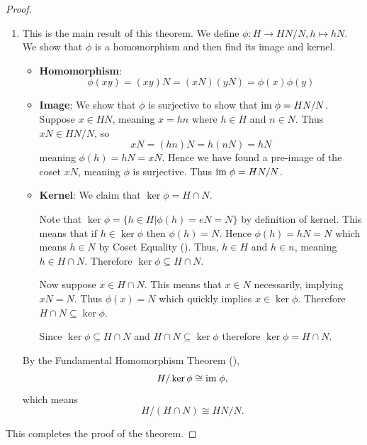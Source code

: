 \begin{proof}
\begin{enumerate}
        \item This is the main result of this theorem. We define $\phi: H \to HN/N, h \mapsto hN$. We show that $\phi$ is a homomorphism and then find its image and kernel.
        \begin{itemize}
            \item \textbf{Homomorphism}:
            \[
                \phi(xy) = (xy)N = (xN)(yN) = \phi(x)\phi(y)    
            \]

            \item \textbf{Image}: We show that $\phi$ is surjective to show that $\mathrm{im}\;\phi = HN/N$. Suppose $x \in HN$, meaning $x = hn$ where $h \in H$ and $n \in N$. Thus $xN \in HN/N$, so
            \[
                xN = (hn)N = h(nN) = hN
            \]
            meaning $\phi(h) = hN = xN$. Hence we have found a pre-image of the coset $xN$, meaning $\phi$ is surjective. Thus $\mathrm{im}\; \phi = HN/N$.

            \item \textbf{Kernel}: We claim that $\ker\phi = H \cap N$.
            
            Note that $\ker\phi = \{h \in H \vert \phi(h) = eN = N\}$ by definition of kernel. This means that if $h \in \ker\phi$ then $\phi(h) = N$. Hence $\phi(h) = hN = N$ which means $h \in N$ by Coset Equality (). Thus, $h \in H$ and $h \in n$, meaning $h \in H \cap N$. Therefore $\ker \phi \subseteq H \cap N$.
    
            Now suppose $x \in H \cap N$. This means that $x \in N$ necessarily, implying $xN = N$. Thus $\phi(x) = N$ which quickly implies $x \in \ker\phi$. Therefore $H \cap N \subseteq \ker\phi$.
    
            Since $\ker \phi \subseteq H \cap N$ and  $H \cap N \subseteq \ker\phi$ therefore $\ker\phi = H\cap N$.
        \end{itemize}

        By the Fundamental Homomorphism Theorem (),
        \[
            H / \ker\phi \cong \mathrm{im}\; \phi,
        \]
        which means
        \[
            H/(H\cap N) \cong HN/N.
        \]
    \end{enumerate}
    This completes the proof of the theorem.
\end{proof}

